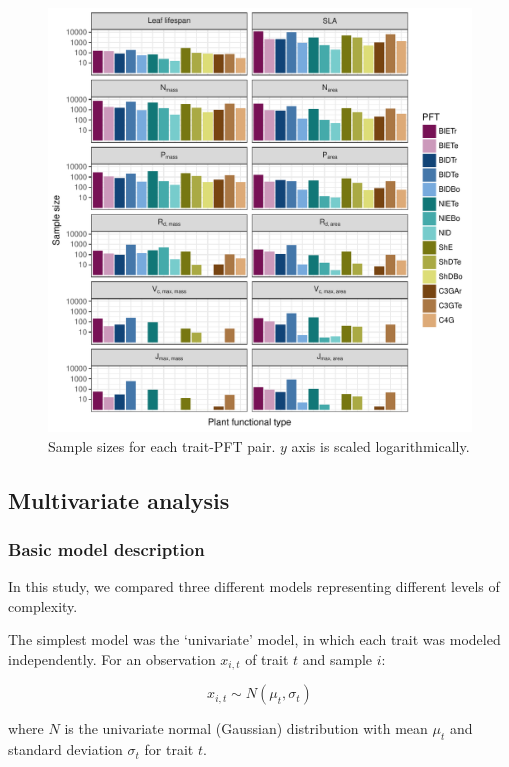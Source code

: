 \begin{figure}
  \centering
  \includegraphics[width=\textwidth]{1_mvtraits/figures/sample_size.pdf}
  \caption{%
    Sample sizes for each trait-PFT pair. $y$ axis is scaled logarithmically.
  }\label{fig:mvtraits-fig1}
\end{figure}


\subsection{Multivariate analysis}

\subsubsection{Basic model description}

In this study, we compared three different models representing different levels of complexity.

The simplest model was the `univariate' model, in which each trait was modeled independently.
For an observation $x_{i,t}$ of trait $t$ and sample $i$:

\[x_{i,t} \sim N(\mu_t, \sigma_t)\]

where $N$ is the univariate normal (Gaussian) distribution with mean $\mu_t$ and standard deviation $\sigma_t$ for trait $t$.

